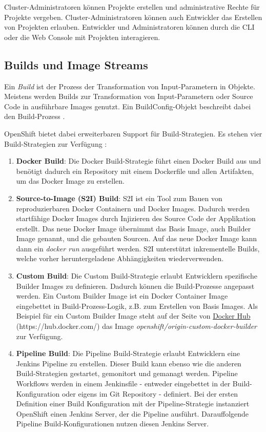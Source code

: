 Cluster-Administratoren können Projekte erstellen und administrative Rechte für Projekte vergeben. Cluster-Administratoren können auch Entwickler das Erstellen von Projekten erlauben. Entwickler und Administratoren können durch die CLI oder die Web Console mit Projekten interagieren.


\subsection{Builds und Image Streams}
Ein \textit{Build} ist der Prozess der Transformation von Input-Parametern in Objekte. Meistens werden Builds zur Transformation von Input-Parametern oder Source Code in ausführbare Images genutzt. Ein BuildConfig-Objekt beschreibt dabei den Build-Prozess \cite{OpenShiftOnline}.

OpenShift bietet dabei erweiterbaren Support für Build-Strategien. Es stehen vier Build-Strategien zur Verfügung \cite{OpenShiftOnline}:
\begin{enumerate}
	\item \textbf{Docker Build}: Die Docker Build-Strategie führt einen Docker Build aus und benötigt dadurch ein Repository mit einem Dockerfile und allen Artifakten, um das Docker Image zu erstellen.
	\item \textbf{Source-to-Image (S2I) Build}: S2I ist ein Tool zum Bauen von reproduzierbaren Docker Containern und Docker Images. Dadurch werden startfähige Docker Images durch Injizieren des Source Code der Applikation erstellt. Das neue Docker Image übernimmt das Basis Image, auch Builder Image genannt, und die gebauten Sourcen. Auf das neue Docker Image kann dann ein \textit{docker run} ausgeführt werden. S2I unterstützt inkrementelle Builds, welche vorher heruntergeladene Abhängigkeiten wiederverwenden.
	\item \textbf{Custom Build}: Die Custom Build-Strategie erlaubt Entwicklern spezifische Builder Images zu definieren. Dadurch können die Build-Prozesse angepasst werden.
	Ein Custom Builder Image ist ein Docker Container Image eingebettet in Build-Prozess-Logik, z.B. zum Erstellen von Basis Images. Als Beispiel für ein Custom Builder Image steht auf der Seite von \href{https://hub.docker.com/}{Docker Hub} (https://hub.docker.com/) das Image \textit{openshift/origin-custom-docker-builder} zur Verfügung.
	\item \textbf{Pipeline Build}: Die Pipeline Build-Strategie erlaubt Entwicklern eine Jenkins Pipeline zu erstellen. Dieser Build kann ebenso wie die anderen Build-Strategien gestartet, gemonitort und gemanagt werden. Pipeline Workflows werden in einem Jenkinsfile - entweder eingebettet in der Build-Konfiguration oder eigens im Git Repository - definiert. Bei der ersten Definition einer Build Konfiguration mit der Pipeline-Strategie instanziert OpenShift einen Jenkins Server, der die Pipeline ausführt. Darauffolgende Pipeline Build-Konfigurationen nutzen diesen Jenkins Server.
\end{enumerate}

